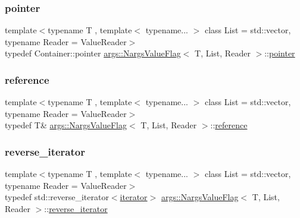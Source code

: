 \mbox{\label{classargs_1_1_nargs_value_flag_a3d6171281cd90e7488401a1f86e4a05a}} 
\subsubsection{\texorpdfstring{pointer}{pointer}}
{\footnotesize\ttfamily template$<$typename T , template$<$ typename... $>$ class List = std\+::vector, typename Reader  = Value\+Reader$>$ \\
typedef Container\+::pointer \hyperlink{classargs_1_1_nargs_value_flag}{args\+::\+Nargs\+Value\+Flag}$<$ T, List, Reader $>$\+::\hyperlink{classargs_1_1_nargs_value_flag_a3d6171281cd90e7488401a1f86e4a05a}{pointer}}

\mbox{\label{classargs_1_1_nargs_value_flag_ab14706e23ffbc72dce81c7eac01e7337}} 
\subsubsection{\texorpdfstring{reference}{reference}}
{\footnotesize\ttfamily template$<$typename T , template$<$ typename... $>$ class List = std\+::vector, typename Reader  = Value\+Reader$>$ \\
typedef T\& \hyperlink{classargs_1_1_nargs_value_flag}{args\+::\+Nargs\+Value\+Flag}$<$ T, List, Reader $>$\+::\hyperlink{classargs_1_1_nargs_value_flag_ab14706e23ffbc72dce81c7eac01e7337}{reference}}

\mbox{\label{classargs_1_1_nargs_value_flag_a6fcba5bdf062ce3cc11e25435ec56eae}} 
\subsubsection{\texorpdfstring{reverse\+\_\+iterator}{reverse\_iterator}}
{\footnotesize\ttfamily template$<$typename T , template$<$ typename... $>$ class List = std\+::vector, typename Reader  = Value\+Reader$>$ \\
typedef std\+::reverse\+\_\+iterator$<$\hyperlink{classargs_1_1_nargs_value_flag_aeaf17e645a109333204dcb7c954a2473}{iterator}$>$ \hyperlink{classargs_1_1_nargs_value_flag}{args\+::\+Nargs\+Value\+Flag}$<$ T, List, Reader $>$\+::\hyperlink{classargs_1_1_nargs_value_flag_a6fcba5bdf062ce3cc11e25435ec56eae}{reverse\+\_\+iterator}}

